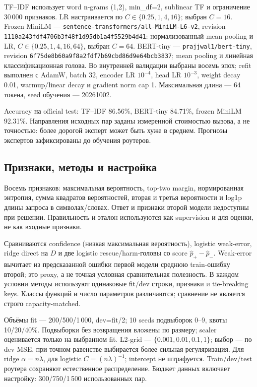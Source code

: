 TF--IDF использует word n-grams (1,2), min\_df=2, sublinear TF
и ограничение 30\,000 признаков. LR настраивается по
$C\in\{0.25,1,4,16\}$; выбран $C=16$.
Frozen MiniLM --- \texttt{sentence-transformers/all-MiniLM-L6-v2},
revision \texttt{1110a243fdf4706b3f48f1d95db1a4f5529b4d41}:
нормализованный mean pooling и LR,
$C\in\{0.25,1,4,16,64\}$, выбран $C=64$.
BERT-tiny --- \texttt{prajjwal1/bert-tiny}, revision
\texttt{6f75de8b60a9f8a2fdf7b69cbd86d9e64bcb3837};
mean pooling и линейная классификационная голова.
Во внутренней валидации выбраны восемь эпох; refit выполнен с AdamW,
batch 32, encoder LR $10^{-4}$, head LR $10^{-3}$,
weight decay 0.01, warmup/linear decay и gradient norm cap 1.
Максимальная длина --- 64 токена, seed обучения --- 20261002.

Accuracy на official test: TF--IDF 86.56\%, BERT-tiny 84.71\%,
frozen MiniLM 92.31\%. Направления исходных пар заданы измеренной
стоимостью вызова, а не точностью: более дорогой эксперт может быть
хуже в среднем. Прогнозы экспертов зафиксированы до обучения роутеров.

\subsection{Признаки, методы и настройка}
Восемь признаков: максимальная вероятность, top-two margin,
нормированная энтропия, сумма квадратов вероятностей, вторая и третья
вероятности и log1p длины запроса в символах/словах. Ответ и признаки
второй модели недоступны при решении. Правильность и эталон используются
как supervision и для оценки, не как входные признаки.

Сравниваются confidence (низкая максимальная вероятность), logistic
weak-error, ridge direct на $D$ и две logistic rescue/harm-головы
со score $\widehat p_+-\widehat p_-$. Weak-error вычитает из
предсказанной ошибки первой модели среднюю train-ошибку второй;
это proxy, а не точная условная сравнительная полезность.
В каждом условии методы используют одинаковые fit/dev строки,
признаки и tie-breaking keys. Классы функций и число параметров
различаются; сравнение не является строго capacity-matched.

Объёмы fit --- 200/500/1\,000, dev=fit/2;
10 seeds подвыборок 0--9, квоты 10/20/40\%.
Подвыборки без возвращения вложены по размеру; scaler оценивается
только на выбранном fit. L2-grid --- $\{0.001,0.01,0.1,1\}$;
выбор --- по dev MSE, при точном равенстве выбирается более сильная
регуляризация. Для ridge $\alpha=n\lambda$, для logistic
$C=(n\lambda)^{-1}$; intercept не штрафуется.
Train/dev/test роутера сохраняют естественное распределение.
Бюджет данных включает настройку: 300/750/1\,500 использованных пар.

